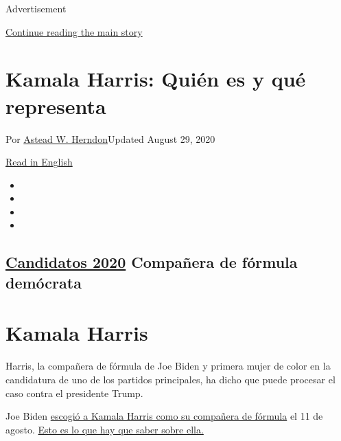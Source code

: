 Advertisement

\protect\hyperlink{after-top}{Continue reading the main story}

\hypertarget{kamala-harris-quiuxe9n-es-y-quuxe9-representa}{%
\section{Kamala Harris: Quién es y qué
representa}\label{kamala-harris-quiuxe9n-es-y-quuxe9-representa}}

Por \href{https://www.nytimes3xbfgragh.onion/by/astead-w-herndon}{Astead
W. Herndon}Updated August 29, 2020

\href{https://www.nytimes3xbfgragh.onion/interactive/2020/us/elections/kamala-harris.html}{Read
in English}

\begin{itemize}
\item
\item
\item
\item
\end{itemize}

\hypertarget{candidatos-2020--compauxf1era-de-fuxf3rmula-demuxf3crata-}{%
\subsection{\texorpdfstring{\href{https://www.nytimes3xbfgragh.onion/interactive/2019/us/politics/2020-presidential-candidates.html}{Candidatos
2020} Compañera de fórmula demócrata
}{Candidatos 2020  Compañera de fórmula demócrata }}\label{candidatos-2020--compauxf1era-de-fuxf3rmula-demuxf3crata-}}

\hypertarget{kamala-harris}{%
\section{Kamala Harris}\label{kamala-harris}}

Harris, la compañera de fórmula de Joe Biden y primera mujer de color en
la candidatura de uno de los partidos principales, ha dicho que puede
procesar el caso contra el presidente Trump.

Joe Biden
\href{https://www.nytimes3xbfgragh.onion/es/2020/08/11/espanol/estados-unidos/kamala-harris-joe-biden-vicepresidenta.html}{escogió
a Kamala Harris como su compañera de fórmula} el 11 de agosto.
\href{https://www.nytimes3xbfgragh.onion/2020/08/11/us/politics/kamala-bio.html}{Esto
es lo que hay que saber sobre ella.}

